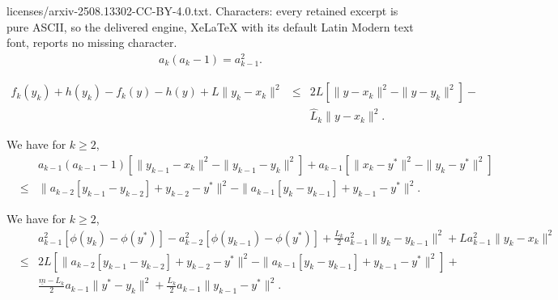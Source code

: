 \documentclass[10pt,a4paper]{amsart}
\begin{document}
licenses/arxiv-2508.13302-CC-BY-4.0.txt. Characters: every retained excerpt is pure ASCII, so the delivered engine, XeLaTeX with its default Latin Modern text font, reports no missing character.
		\begin{eqnarray}\label{eq:ak}
		a_{k} (a_{k} - 1) = a_{k-1}^2.
		\end{eqnarray}

\begin{eqnarray}
f_{k}(y_{k}) + h(y_{k}) - f_{k}(y) - h(y) + L\| y_{k} - {x}_{k} \|^2  & \leq &   2L [\| y - {x}_{k} \|^2 - \| y - y_{k} \|^2] - \nonumber \\
& &  \hat{L}_k  \| y - {x}_{k} \|^2.   \label{ineq:convexityfk}
\end{eqnarray}

\begin{proposition}\label{prop:technical}
We have for $k \geq 2$, 
\begin{eqnarray}
& & a_{k-1}(a_{k-1}-1)[\| y_{k-1} - {x}_{k} \|^2 - \| y_{k-1} - y_{k} \|^2] + a_{k-1}[\| {x}_{k} - y^\ast \|^2 - \| y_{k} - y^\ast \|^2] \nonumber \\
& \leq & \|a_{k-2}[ y_{k-1} - y_{k-2}]  + y_{k-2} - y^\ast \|^2 - \| a_{k-1}[ y_{k} - y_{k-1}]  + y_{k-1} - y^\ast \|^2.  \label{ineq:technical}
\end{eqnarray}
\end{proposition}

\begin{lemma}\label{lem:keyinequality}
We have for $k \geq 2$,
\begin{eqnarray}
& & a_{k-1}^2[\phi(y_{k}) - \phi(y^\ast)] - a_{k-2}^2 [\phi(y_{k-1}) - \phi(y^\ast)] + \frac{L_k}{2}a_{k-1}^2\|y_{k} - y_{k-1} \|^2 +  L a_{k-1}^2 \| y_{k} - {x}_{k} \|^2 \nonumber \\
& \leq &   2 L [\|a_{k-2}[ y_{k-1} - y_{k-2}]  + y_{k-2} - y^\ast \|^2 - \| a_{k-1}[ y_{k} - y_{k-1}]  + y_{k-1} - y^\ast \|^2] + \nonumber \\
&   & \frac{\underline{m} - L_k}{2} a_{k-1}  \| y^\ast - y_{k} \|^2 + \frac{L_k}{2} a_{k-1} \| y_{k-1} - y^\ast \|^2. \label{ineq:convexityfk7}
\end{eqnarray}
\end{lemma}
\end{document}

